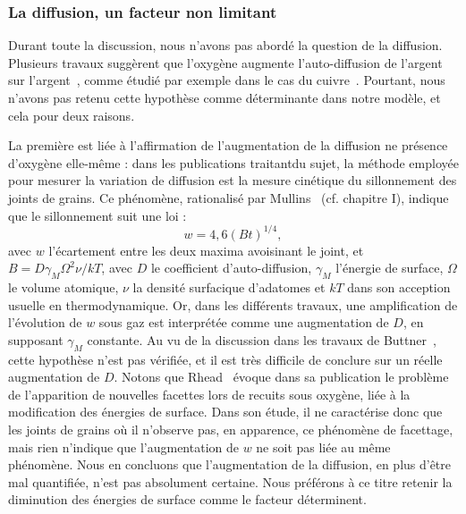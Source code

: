 			\subsubsection{La diffusion, un facteur non limitant}
Durant toute la discussion, nous n’avons pas abordé la question de la diffusion. Plusieurs travaux suggèrent que l’oxygène augmente l’auto-diffusion de l’argent sur l’argent~\cite{rhead1963surface, yoshihara1979effect}, comme étudié par exemple dans le cas du cuivre~\cite{bradshaw1964surface}. Pourtant, nous n’avons pas retenu cette hypothèse comme déterminante dans notre modèle, et cela pour deux raisons.\par 
La première est liée à l’affirmation de l’augmentation de la diffusion ne présence d'oxygène elle-même : dans les publications traitantdu sujet, la méthode employée pour mesurer la variation de diffusion est la mesure cinétique du sillonnement des joints de grains. Ce phénomène, rationalisé par Mullins~\cite{mullins1957theory} (cf. chapitre I), indique que le sillonnement suit une loi :
\begin{equation}
w = 4,6(Bt)^{1/4},
\end{equation}
avec $w$ l’écartement entre les deux maxima avoisinant le joint, et $B = D\gamma_M \Omega^2\nu/kT$, avec $D$ le
coefficient d’auto-diffusion, $\gamma_M $ l’énergie de surface, $\Omega$ le volume atomique, $\nu$ la densité surfacique
d’adatomes et $kT$ dans son acception usuelle en thermodynamique. Or, dans les différents travaux, une amplification de l’évolution de $w$ sous gaz est interprétée comme une augmentation de $D$, en supposant $\gamma_M$ constante. Au vu de la discussion dans les travaux de Buttner~\cite{buttner1952adsorption}, cette hypothèse n’est pas vérifiée, et il est très difficile de conclure sur un réelle augmentation de $D$. Notons que Rhead~\cite{rhead1963surface} évoque dans sa publication le problème de l’apparition de nouvelles facettes lors de recuits sous oxygène, liée à la modification des énergies de surface. Dans son étude, il ne caractérise donc que les joints de grains où il n’observe pas, en apparence, ce phénomène de facettage, mais rien n'indique que l'augmentation de $w$ ne soit pas liée au même phénomène. Nous en concluons que l’augmentation de la diffusion, en plus d’être mal quantifiée, n’est pas absolument certaine. Nous préférons à ce titre retenir la diminution des énergies de surface comme le facteur déterminent.\par 
